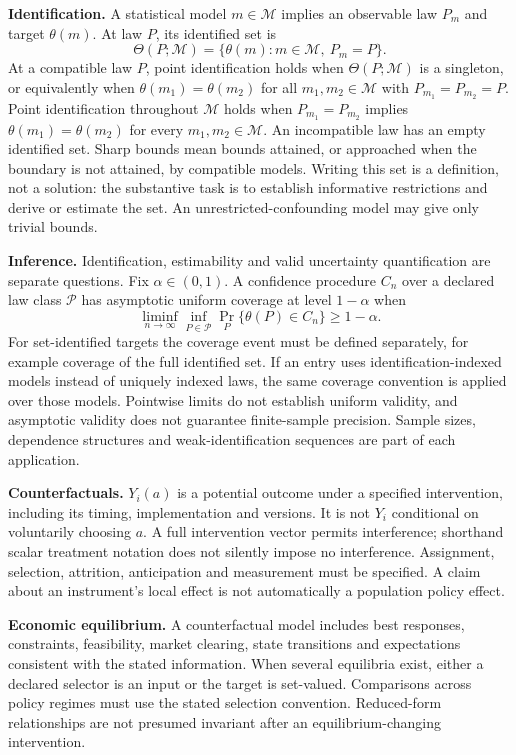 \documentclass[11pt,a4paper]{article}
\begin{document}
\textbf{Identification.} A statistical model $m\in\mathcal M$ implies an observable law $P_m$ and target $\theta(m)$. At law $P$, its identified set is
\[
\Theta(P;\mathcal M)=\{\theta(m):m\in\mathcal M,\ P_m=P\}.
\]
At a compatible law $P$, point identification holds when $\Theta(P;\mathcal M)$ is a singleton, or equivalently when $\theta(m_1)=\theta(m_2)$ for all $m_1,m_2\in\mathcal M$ with $P_{m_1}=P_{m_2}=P$. Point identification throughout $\mathcal M$ holds when $P_{m_1}=P_{m_2}$ implies $\theta(m_1)=\theta(m_2)$ for every $m_1,m_2\in\mathcal M$. An incompatible law has an empty identified set. Sharp bounds mean bounds attained, or approached when the boundary is not attained, by compatible models. Writing this set is a definition, not a solution: the substantive task is to establish informative restrictions and derive or estimate the set. An unrestricted-confounding model may give only trivial bounds.

\textbf{Inference.} Identification, estimability and valid uncertainty quantification are separate questions. Fix $\alpha\in(0,1)$. A confidence procedure $C_n$ over a declared law class $\mathcal P$ has asymptotic uniform coverage at level $1-\alpha$ when
\[
\liminf_{n\to\infty}\inf_{P\in\mathcal P}\Pr_P\{\theta(P)\in C_n\}\geq1-\alpha.
\]
For set-identified targets the coverage event must be defined separately, for example coverage of the full identified set. If an entry uses identification-indexed models instead of uniquely indexed laws, the same coverage convention is applied over those models. Pointwise limits do not establish uniform validity, and asymptotic validity does not guarantee finite-sample precision. Sample sizes, dependence structures and weak-identification sequences are part of each application.

\textbf{Counterfactuals.} $Y_i(a)$ is a potential outcome under a specified intervention, including its timing, implementation and versions. It is not $Y_i$ conditional on voluntarily choosing $a$. A full intervention vector permits interference; shorthand scalar treatment notation does not silently impose no interference. Assignment, selection, attrition, anticipation and measurement must be specified. A claim about an instrument's local effect is not automatically a population policy effect.

\textbf{Economic equilibrium.} A counterfactual model includes best responses, constraints, feasibility, market clearing, state transitions and expectations consistent with the stated information. When several equilibria exist, either a declared selector is an input or the target is set-valued. Comparisons across policy regimes must use the stated selection convention. Reduced-form relationships are not presumed invariant after an equilibrium-changing intervention.
\end{document}
